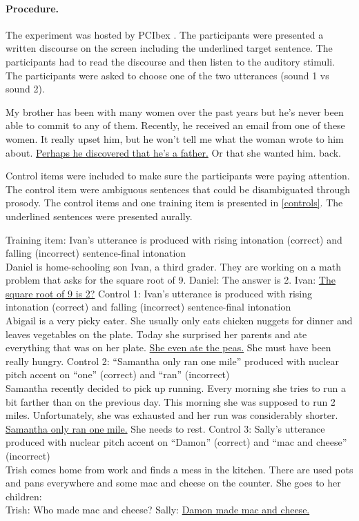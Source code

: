 \documentclass[dina4,12pt,fleqn]{article}
\newcommand{\6}{\mbox{$[\hspace*{-.6mm}[$}}
\newcommand{\9}{\mbox{$]\hspace*{-.6mm}]$}}
\begin{document}
\newpage

\paragraph{Procedure.} The experiment was hosted by PCIbex \citealt{zehr-schwarz-2018}.
The participants were presented a written discourse on the screen including the underlined target sentence. The participants had to read the discourse and then listen to the auditory stimuli. The participants were asked to choose one of the two utterances (sound  1 vs sound 2).

\begin{exe}
\ex My brother has been with many women over the past years but he’s never been able to commit to any of them. Recently, he
received an email from one of these women. It really upset him, but he won’t tell me what the
woman wrote to him about. \underline{Perhaps he discovered that he’s a father.} Or that she wanted him. back.
\end{exe}

Control items were included to make sure the participants were paying attention. The control item were ambiguous sentences that could be disambiguated through prosody. The control items and one training item is presented in \ref{controls}. The underlined sentences were presented aurally.

\begin{exe}
\ex\label{controls}
\begin{xlist}
\ex Training item:  Ivan’s utterance is produced with rising intonation (correct) and falling (incorrect) sentence-final intonation  \\
Daniel is home-schooling son Ivan, a third grader. They are working on a math problem that asks for the square root of 9.
Daniel: The answer is 2.
Ivan: \underline{The square root of 9 is 2?}
\ex  Control 1:  Ivan’s utterance is produced with rising intonation (correct) and falling (incorrect) sentence-final intonation  \\
Abigail is a very picky eater. She usually only eats chicken nuggets for dinner and leaves vegetables on the plate. Today she surprised her parents and ate everything that was on her plate. \underline{She even ate the peas.} She must have been really hungry.
\ex Control 2: “Samantha only ran one mile” produced with nuclear pitch accent on “one” (correct) and “ran” (incorrect) \\
Samantha recently decided to pick up running. Every morning she tries to run a bit farther than on the previous day. This morning she was supposed to run 2 miles. Unfortunately, she was exhausted and her run was considerably shorter. \underline{Samantha only ran one mile.} She needs to rest.
\ex Control 3: Sally’s utterance produced with nuclear pitch accent on “Damon” (correct) and “mac and cheese” (incorrect) \\
Trish comes home from work and finds a mess in the kitchen. There are used pots and pans everywhere and some mac and cheese on the counter. She goes to her children: \\
Trish: Who made mac and cheese?
Sally: \underline{Damon made mac and cheese.}
\end{xlist}
\end{exe}
\end{document}
